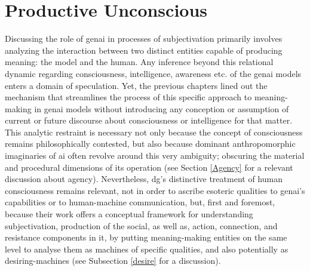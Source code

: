 \section{Productive Unconscious}


Discussing the role of \gls{genai} in processes of subjectivation primarily involves analyzing the interaction between two distinct entities capable of producing meaning: the model and the human. Any inference beyond this relational dynamic regarding consciousness, intelligence, awareness etc. of the \gls{genai} models  enters a domain of speculation. Yet, the
previous chapters lined out the mechanism that streamlines the process of this
specific approach to meaning-making in \gls{genai} models without introducing
any conception or assumption of current or future discourse about
consciousness or intelligence for that matter. This analytic restraint is necessary not only because the concept of consciousness remains philosophically contested, but also because dominant anthropomorphic imaginaries of \gls{ai} often revolve around this very ambiguity; obscuring the material and procedural dimensions of its operation (see Section \ref{Agency} for a relevant discussion about agency).
Nevertheless, \gls{dg}'s  distinctive treatment of human consciousness remains relevant, not in order to ascribe esoteric qualities to \gls{genai}'s capabilities or to human-machine communication, but, first and foremost, because their work offers a conceptual framework for understanding subjectivation, production of the social, as well as, action, connection,  and resistance components in it, by putting meaning-making entities on the same level to analyse them as machines of specific qualities, and also potentially as desiring-machines (see Subsection \ref{desire} for a discussion).

